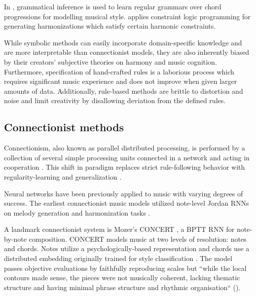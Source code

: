 
In \citet{cruz1998learning}, grammatical inference is used to learn regular
grammars over chord progressions for modelling musical style.
\citet{tsang1991harmonizing} applies constraint logic programming for
generating harmonizations which satisfy certain harmonic constraints.


While symbolic methods can easily incorporate domain-specific knowledge and are
more interpretable than connectionist models, they are also inherently biased
by their creators' subjective theories on harmony and music cognition.
Furthermore, specification of hand-crafted rules is a laborious process which
requires significant music experience and does not improve when given larger
amounts of data. Additionally, rule-based methods are brittle to distortion and
noise and limit creativity by disallowing deviation from the defined rules.

\subsection{Connectionist methods}

Connectionism, also known as parallel distributed processing, is performed by a
collection of several simple processing units connected in a network and acting
in cooperation \citep{pdp1986parallel}. This shift in paradigm replaces strict
rule-following behavior with regularity-learning and generalization
\citep{dolson1989machine}.

Neural networks have been previously applied to music with varying degrees of
success\citep{griffith1999musical}. The earliest connectionist music models
utilized note-level Jordan RNNs on melody generation and harmonization tasks
\citep{todd1988sequential,todd1989connectionist,bharucha1989modeling}.

A landmark connectionist system is Mozer's CONCERT \citep{mozer1994neural}, a
BPTT RNN for note-by-note composition. CONCERT models music at two
levels of resolution: notes and chords. Notes utilize a psychologically-based
representation \citep{shepard1982geometrical} and chords use a distributed
embedding originally trained for style classification
\citep{laden1989representation}. The model passes objective evaluations by
faithfully reproducing scales but ``while the local contours made sense, the
pieces were not musically coherent, lacking thematic structure and having
minimal phrase structure and rhythmic organisation`` (\citet{mozer1994neural}).

